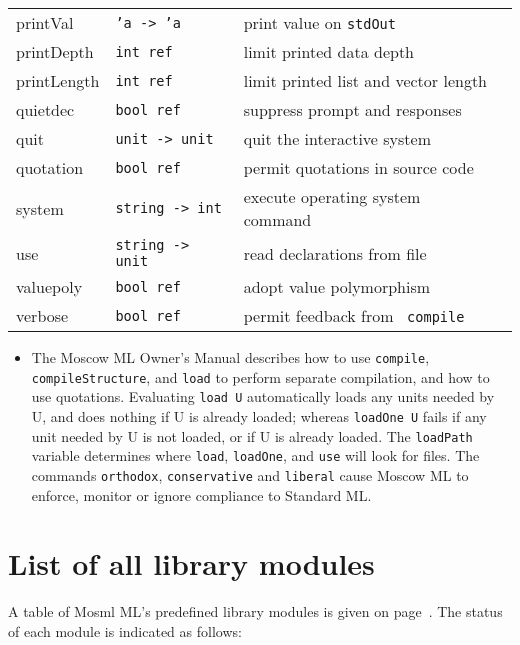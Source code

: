 \documentclass[fleqn,a4paper]{article}
\begin{document}
\begin{tabular}{@{\tt\ \ }llll}
printVal       & {\tt 'a -> 'a}  & print value on \verb#stdOut#\\
printDepth     & {\tt int ref}   & limit printed data depth\\
printLength    & {\tt int ref}   & limit printed list and vector length\\
quietdec       & {\tt bool ref}  & suppress prompt and responses\\
quit           & {\tt unit -> unit} & quit the interactive system\\
quotation      & {\tt bool ref}   & permit quotations in source code\\
system         & {\tt string -> int} & execute operating system command\\
use            & {\tt string -> unit} & read declarations from file\\
valuepoly      & {\tt bool ref}   & adopt value polymorphism \\
verbose        & {\tt bool ref}   & permit feedback from {\tt
  compile}\\\hline
\end{tabular}

\begin{itemize}
\item The Moscow ML Owner's Manual describes how to use {\tt compile},
  {\tt compileStructure}, 
  and {\tt load} to perform separate compilation, and how to use
  quotations.  Evaluating {\tt load {\rm U}} automatically loads any
  units needed by U, and does nothing if U is already loaded; whereas
  {\tt loadOne {\rm U}} fails if any unit needed by U is not loaded,
  or if U is already loaded.  The {\tt loadPath} variable determines
  where {\tt load}, {\tt loadOne}, and {\tt use} will look for files.
  The commands {\tt orthodox}, {\tt conservative} and {\tt liberal}
  cause Moscow ML to enforce, monitor or ignore compliance to Standard ML.
\end{itemize}

\newpage
\section{List of all library modules}

A table of Mosml ML's predefined library modules is given on
page~\pageref{table-predefined-units}.  The status of each module is
indicated as follows:
\end{document}
